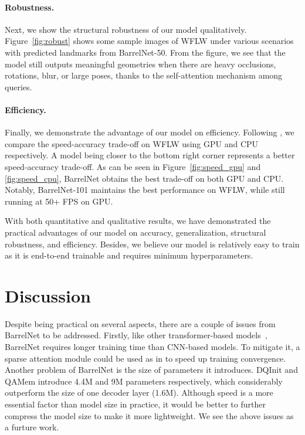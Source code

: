 \documentclass{article}
\begin{document}
\paragraph{Robustness.}
Next, we show the structural robustness of our model qualitatively. Figure~\ref{fig:robust} shows some sample images of WFLW under various scenarios with predicted landmarks from BarrelNet-50. From the figure, we see that the model still outputs meaningful geometries when there are heavy occlusions, rotations, blur, or large poses, thanks to the self-attention mechanism among queries. 

\paragraph{Efficiency.}
Finally, we demonstrate the advantage of our model on efficiency. Following \citep{JLS20}, we compare the speed-accuracy trade-off on WFLW using GPU and CPU respectively. A model being closer to the bottom right corner represents a better speed-accuracy trade-off. As can be seen in Figure~\ref{fig:speed_gpu} and \ref{fig:speed_cpu}, BarrelNet obtains the best trade-off on both GPU and CPU. Notably, BarrelNet-101 maintains the best performance on WFLW, while still running at 50+ FPS on GPU.

With both quantitative and qualitative results, we have demonstrated the practical advantages of our model on accuracy, generalization, structural robustness, and efficiency. Besides, we believe our model is relatively easy to train as it is end-to-end trainable and requires minimum hyperparameters.

\section{Discussion}
\label{sec:5}

Despite being practical on several aspects, there are a couple of issues from BarrelNet to be addressed. Firstly, like other transformer-based models~\citep{VSP17,CMS20}, BarrelNet requires longer training time than CNN-based models. To mitigate it, a sparse attention module could be used as in \citep{ZSL21} to speed up training convergence. Another problem of BarrelNet is the size of parameters it introduces. DQInit and QAMem introduce 4.4M and 9M parameters respectively, which considerably outperform the size of one decoder layer (1.6M). Although speed is a more essential factor than model size in practice, it would be better to further compress the model size to make it more lightweight. We see the above issues as a furture work.  
\end{document}
